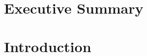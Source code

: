 \documentclass[12pt, titlepage, onecolumn]{article}
\begin{document}
\begin{titlepage}

\end{titlepage}
\frontmatter
\section*{Executive Summary}

\clearpage
\begin{singlespace}
\tableofcontents
\clearpage
\end{singlespace}
\clearpage
\setlength{\parindent}{0em}
\setlength{\parskip}{1em}
\mainmatter

\section{Introduction}




\clearpage
\backmatter
\begin{singlespace}
    



\clearpage
\end{singlespace}
\end{document}
